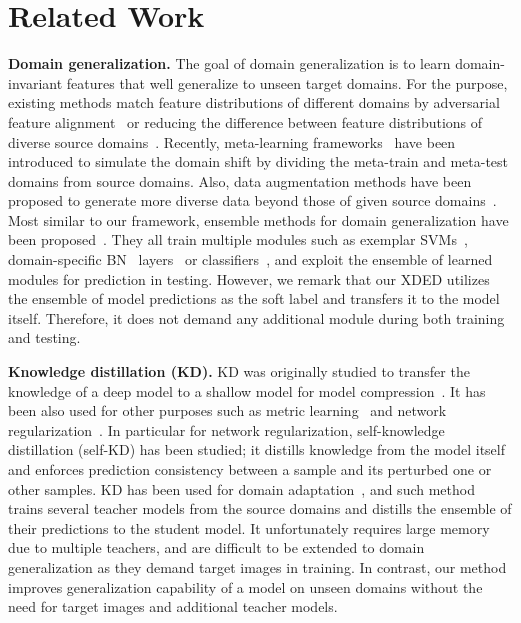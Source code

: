 \documentclass[runningheads]{llncs}
\begin{document}
 \section{Related Work}
\label{relatedwork}

\noindent \textbf{Domain generalization.} 
The goal of domain generalization is to learn domain-invariant features that well generalize to unseen target domains. 
For the purpose, existing methods match feature distributions of different domains by adversarial feature alignment~\cite{li2018domain,li2018deep} or reducing the difference between feature distributions of diverse source domains~\cite{muandet2013domain}. 
Recently, meta-learning frameworks~\cite{balaji2018metareg,dou2019domain,li2019episodic} have been introduced to simulate the domain shift by dividing the meta-train and meta-test domains from source domains. 
Also, data augmentation methods have been proposed to generate more diverse data beyond those of given source domains~\cite{StyleNeophile,kim2021wedge,shankar2018generalizing,xu2021fourier,zhou2020learning}. 
Most similar to our framework, ensemble methods for domain generalization have been proposed~\cite{xu2014exploiting,seo2020learning,zhou2021dael}. They all train multiple modules such as exemplar SVMs~\cite{xu2014exploiting}, domain-specific BN~\cite{Batchnorm} layers~\cite{seo2020learning} or classifiers~\cite{zhou2021dael}, and exploit the ensemble of learned modules for prediction in testing.
However, we remark that our XDED utilizes the ensemble of model predictions as the soft label and transfers it to the model itself. Therefore, it does not demand any additional module during both training and testing. 


\noindent \textbf{Knowledge distillation (KD).}
KD
was originally studied to transfer the knowledge of a deep model to a shallow model for model compression~\cite{hinton2015distilling}. 
It has been also used for other purposes such as metric learning~\cite{park2019relational,kim2021embedding} and network regularization~\cite{xu2019data,zhang2019your,yun2020regularizing}.
In particular for network regularization, self-knowledge distillation (self-KD) has been studied; it distills knowledge from the model itself and enforces prediction consistency between a sample and its perturbed one or other samples.
KD has been used for domain adaptation~\cite{meng2018adversarial,feng2020kd3a}, and such method trains several teacher models from the source domains and distills the ensemble of their predictions to the student model. 
It unfortunately requires large memory due to multiple teachers, and are difficult to be extended to domain generalization as they demand target images in training.
In contrast, our method improves generalization capability of a model on unseen domains without the need for target images and additional teacher models.
\end{document}
